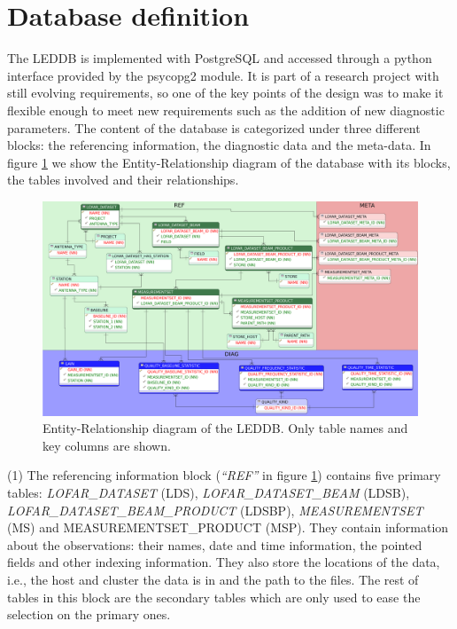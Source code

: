 \section{Database definition} 

The LEDDB is implemented with PostgreSQL and accessed through a python interface provided by the psycopg2 module. It is part of a research project with still evolving requirements, so one of the key points of the design was to make it flexible enough to meet new requirements such as the addition of new diagnostic parameters. The content of the database is categorized under three different blocks: the referencing information, the diagnostic data and the meta-data. In figure \ref{fig:leddber} we show the Entity-Relationship diagram of the database with its blocks, the tables involved and their relationships.
\begin{figure}[!ht]
  \centering
    \includegraphics[scale=0.077]{part10/Martinez-rubi_O23/O23_f1.eps} 
  \caption{Entity-Relationship diagram of the LEDDB. Only table names and key columns are shown.}
  \label{fig:leddber}
\end{figure}

(1) The referencing information block (\textit{``REF''} in figure \ref{fig:leddber}) contains five primary tables: \textit{LOFAR\-\_DATA\-SET} (LDS), \textit{LOFAR\-\_DATA\-SET\-\_BEAM} (LDSB), \textit{LOFAR\-\_DATA\-SET\-\_BEAM\-\_PRODUCT} (LDSBP), \textit{MEA\-SU\-RE\-MENT\-SET} (MS) and {MEA\-SU\-RE\-MENT\-SET\-\_PRODUCT} (MSP). They contain information about the observations: their names, date and time information, the pointed fields and other indexing information. They also store the locations of the data, i.e., the host and cluster the data is in and the path to the files. The rest of tables in this block are the secondary tables which are only used to ease the selection on the primary ones.

